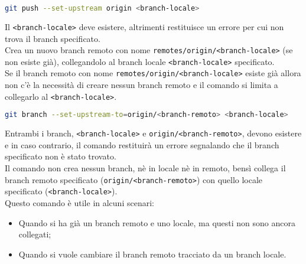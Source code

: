 \begin{lstlisting}[language=bash]
	git push --set-upstream origin <branch-locale>
\end{lstlisting}
Il \texttt{<branch-locale>} deve esistere, altrimenti restituisce un errore per cui non trova il branch specificato.\\ 
Crea un nuovo branch remoto con nome \texttt{remotes/origin/<branch-locale>} (se non esiste già), collegandolo al branch locale \texttt{<branch-locale>} specificato.\\
Se il branch remoto con nome \texttt{remotes/origin/<branch-locale>} esiste già allora non c'è la necessità di creare nessun branch remoto e il comando si limita a collegarlo al \texttt{<branch-locale>}.\\

\begin{lstlisting}[language=bash]
	git branch --set-upstream-to=origin/<branch-remoto> <branch-locale>
\end{lstlisting}
Entrambi i branch, \texttt{<branch-locale>} e \texttt{origin/<branch-remoto>}, devono esistere e in caso contrario, il comando restituirà un errore segnalando che il branch specificato non è stato trovato.\\ 
Il comando non crea nessun branch, nè in locale nè in remoto, bensì collega il branch remoto specificato (\texttt{origin/<branch-remoto>}) con quello locale specificato (\texttt{<branch-locale>}).\\
Questo comando è utile in alcuni scenari:
\begin{itemize}[noitemsep, topsep=3pt]
	\item Quando si ha già un branch remoto e uno locale, ma questi non sono ancora collegati;
	\item Quando si vuole cambiare il branch remoto tracciato da un branch locale.
\end{itemize}

